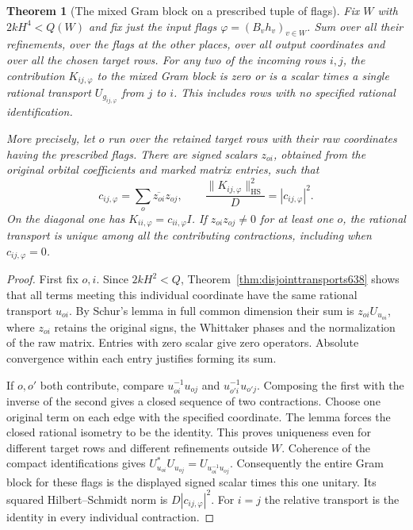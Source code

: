 \documentclass[a4paper,11pt]{article}
\newtheorem{theorem}[proposition]{Theorem}
\theoremstyle{definition}
\theoremstyle{remark}
\numberwithin{equation}{section}
\begin{document}
\begin{theorem}[The mixed Gram block on a prescribed tuple of flags]
\leavevmode\label{thm:mixedflags653}
Fix \(W\) with \(2kH^4<Q(W)\) and fix just the input flags
\(\varphi=(B_vh_v)_{v\in W}\). Sum over all their refinements,
over the flags at the other places, over all output coordinates
and over all the chosen target rows. For any two of the incoming
rows \(i,j\), the contribution \(K_{ij,\varphi}\) to the mixed
Gram block is zero or is a scalar times a single rational
transport \(U_{g_{ij,\varphi}}\) from \(j\) to \(i\).
This includes rows with no specified rational identification.

More precisely, let \(o\) run over the retained target rows
with their raw coordinates having the prescribed flags.
There are signed scalars \(z_{oi}\), obtained from the original
orbital coefficients and marked matrix entries, such that
\[
 c_{ij,\varphi}=\sum_o\overline{z_{oi}}z_{oj},\qquad
       \frac{\|K_{ij,\varphi}\|_{\mathrm{HS}}^2}{D}
                    =|c_{ij,\varphi}|^2 .
\]
On the diagonal one has \(K_{ii,\varphi}=c_{ii,\varphi}I\).
If \(z_{oi}z_{oj}\ne0\) for at least one \(o\), the rational
transport is unique among all the contributing contractions,
including when \(c_{ij,\varphi}=0\).
\end{theorem}
\begin{proof}
First fix \(o,i\). Since \(2kH^2<Q\),
Theorem~\ref{thm:disjointtransports638} shows that all terms
meeting this individual coordinate have the same rational
transport \(u_{oi}\). By Schur's lemma in full common
dimension their sum is \(z_{oi}U_{u_{oi}}\), where \(z_{oi}\)
retains the original signs, the Whittaker phases and the
normalization of the raw matrix. Entries with zero scalar
give zero operators. Absolute convergence within each entry
justifies forming its sum.

If \(o,o'\) both contribute, compare \(u_{oi}^{-1}u_{oj}\)
and \(u_{o'i}^{-1}u_{o'j}\). Composing the first with the
inverse of the second gives a closed sequence of two
contractions. Choose one original term on each edge with the
specified coordinate. The lemma forces the closed rational
isometry to be the identity. This proves uniqueness even for
different target rows and different refinements outside \(W\).
Coherence of the compact identifications gives
\(U_{u_{oi}}^*U_{u_{oj}}=U_{u_{oi}^{-1}u_{oj}}\).
Consequently the entire Gram block for these flags is the
displayed signed scalar times this one unitary. Its squared
Hilbert--Schmidt norm is \(D|c_{ij,\varphi}|^2\).
For \(i=j\) the relative transport is the identity in
every individual contraction.
\end{proof}
\end{document}
